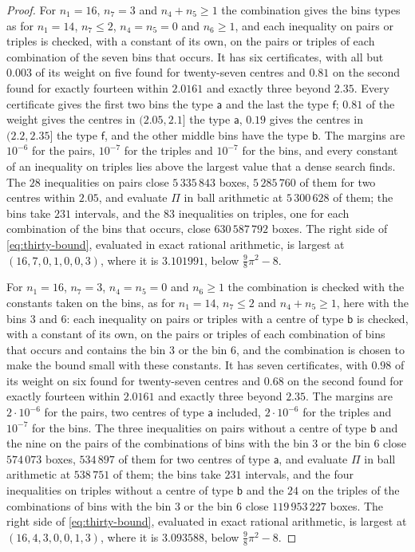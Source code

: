 \documentclass[11pt,reqno]{amsart}
\renewcommand{\_}{\origunderscore\allowbreak}
\numberwithin{equation}{section}
\theoremstyle{plain}
\theoremstyle{definition}
\theoremstyle{remark}
\begin{document}
\begin{proof}
For $n_1=16$, $n_7=3$ and $n_4+n_5\ge1$ the combination gives the bins
types as for $n_1=14$, $n_7\le2$, $n_4=n_5=0$ and $n_6\ge1$, and each
inequality on pairs or triples is checked, with a constant of its own, on
the pairs or triples of each combination of the seven bins that occurs. It
has six certificates, with all but $0.003$ of its weight on five found for
twenty-seven centres and $0.81$ on the second found for exactly fourteen
within $2.0161$ and exactly three beyond $2.35$. Every certificate gives
the first two bins the type $\mathsf a$ and the last the type $\mathsf f$;
$0.81$ of the weight gives the centres in $(2.05,2.1]$ the type $\mathsf a$,
$0.19$ gives the centres in $(2.2,2.35]$ the type $\mathsf f$, and the
other middle bins have the type $\mathsf b$. The margins are $10^{-6}$ for
the pairs, $10^{-7}$ for the triples and $10^{-7}$ for the bins, and every
constant of an inequality on triples lies above the largest value that a
dense search finds. The $28$ inequalities on pairs close $5\,335\,843$
boxes, $5\,285\,760$ of them for two centres within $2.05$, and evaluate
$\Pi$ in ball arithmetic at $5\,300\,628$ of them; the bins take $231$
intervals, and the $83$ inequalities on triples, one for each combination
of the bins that occurs, close $630\,587\,792$ boxes. The right side of
\eqref{eq:thirty-bound}, evaluated in exact rational arithmetic, is largest
at $(16,7,0,1,0,0,3)$, where it is $3.101991$, below $\frac98\pi^2-8$.

For $n_1=16$, $n_7=3$, $n_4=n_5=0$ and $n_6\ge1$ the combination is
checked with the constants taken on the bins, as for $n_1=14$, $n_7\le2$
and $n_4+n_5\ge1$, here with the bins $3$ and $6$: each inequality on
pairs or triples with a centre of type $\mathsf b$ is checked, with a
constant of its own, on the pairs or triples of each combination of bins
that occurs and contains the bin $3$ or the bin $6$, and the combination is
chosen to make the bound small with these constants. It has seven
certificates, with $0.98$ of its weight on six found for twenty-seven
centres and $0.68$ on the second found for exactly fourteen within
$2.0161$ and exactly three beyond $2.35$. The margins are $2\cdot10^{-6}$
for the pairs, two centres of type $\mathsf a$ included,
$2\cdot10^{-6}$ for the triples and $10^{-7}$ for the bins. The three
inequalities on pairs without a centre of type $\mathsf b$ and the nine on
the pairs of the combinations of bins with the bin $3$ or the bin $6$ close
$574\,073$ boxes, $534\,897$ of them for two centres of type $\mathsf a$,
and evaluate $\Pi$ in ball arithmetic at $538\,751$ of them; the bins take
$231$ intervals, and the four inequalities on triples without a centre of
type $\mathsf b$ and the $24$ on the triples of the combinations of bins
with the bin $3$ or the bin $6$ close $119\,953\,227$ boxes. The right
side of \eqref{eq:thirty-bound}, evaluated in exact rational arithmetic, is
largest at $(16,4,3,0,0,1,3)$, where it is $3.093588$, below
$\frac98\pi^2-8$.


\end{proof}
\end{document}
